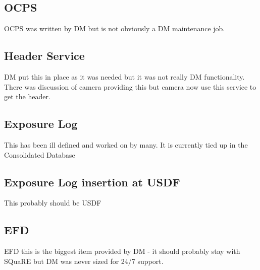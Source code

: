 \subsection{ \gls{OCPS} }
\gls{OCPS}   was  written by \gls{DM} but is  not obviously a \gls{DM} maintenance job.

\subsection{ Header Service }
 \gls{DM} put this in place as it was  needed but it was not really \gls{DM} functionality.
There was discussion of camera providing this but camera now use this service to get the header.

\subsection{ Exposure Log}
This has been ill defined and worked on by many.
It is currently tied up in the Consolidated Database 

\subsection{ Exposure Log  insertion at \gls{USDF}}
  This probably  should be \gls{USDF}

\subsection{ \gls{EFD}}
 EFD this is the biggest item provided by \gls{DM} - it should probably stay with SQuaRE but \gls{DM} was never sized for 24/7 support.

